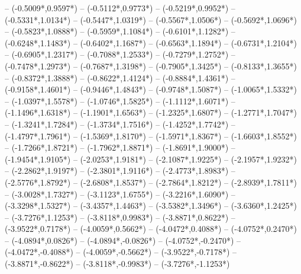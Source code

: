 {	-- ({-0.5009*\dx},{0.9597*\dy})
	-- ({-0.5112*\dx},{0.9773*\dy})
	-- ({-0.5219*\dx},{0.9952*\dy})
	-- ({-0.5331*\dx},{1.0134*\dy})
	-- ({-0.5447*\dx},{1.0319*\dy})
	-- ({-0.5567*\dx},{1.0506*\dy})
	-- ({-0.5692*\dx},{1.0696*\dy})
	-- ({-0.5823*\dx},{1.0888*\dy})
	-- ({-0.5959*\dx},{1.1084*\dy})
	-- ({-0.6101*\dx},{1.1282*\dy})
	-- ({-0.6248*\dx},{1.1483*\dy})
	-- ({-0.6402*\dx},{1.1687*\dy})
	-- ({-0.6563*\dx},{1.1894*\dy})
	-- ({-0.6731*\dx},{1.2104*\dy})
	-- ({-0.6905*\dx},{1.2317*\dy})
	-- ({-0.7088*\dx},{1.2533*\dy})
	-- ({-0.7279*\dx},{1.2752*\dy})
	-- ({-0.7478*\dx},{1.2973*\dy})
	-- ({-0.7687*\dx},{1.3198*\dy})
	-- ({-0.7905*\dx},{1.3425*\dy})
	-- ({-0.8133*\dx},{1.3655*\dy})
	-- ({-0.8372*\dx},{1.3888*\dy})
	-- ({-0.8622*\dx},{1.4124*\dy})
	-- ({-0.8884*\dx},{1.4361*\dy})
	-- ({-0.9158*\dx},{1.4601*\dy})
	-- ({-0.9446*\dx},{1.4843*\dy})
	-- ({-0.9748*\dx},{1.5087*\dy})
	-- ({-1.0065*\dx},{1.5332*\dy})
	-- ({-1.0397*\dx},{1.5578*\dy})
	-- ({-1.0746*\dx},{1.5825*\dy})
	-- ({-1.1112*\dx},{1.6071*\dy})
	-- ({-1.1496*\dx},{1.6318*\dy})
	-- ({-1.1901*\dx},{1.6563*\dy})
	-- ({-1.2325*\dx},{1.6807*\dy})
	-- ({-1.2771*\dx},{1.7047*\dy})
	-- ({-1.3241*\dx},{1.7284*\dy})
	-- ({-1.3734*\dx},{1.7516*\dy})
	-- ({-1.4252*\dx},{1.7742*\dy})
	-- ({-1.4797*\dx},{1.7961*\dy})
	-- ({-1.5369*\dx},{1.8170*\dy})
	-- ({-1.5971*\dx},{1.8367*\dy})
	-- ({-1.6603*\dx},{1.8552*\dy})
	-- ({-1.7266*\dx},{1.8721*\dy})
	-- ({-1.7962*\dx},{1.8871*\dy})
	-- ({-1.8691*\dx},{1.9000*\dy})
	-- ({-1.9454*\dx},{1.9105*\dy})
	-- ({-2.0253*\dx},{1.9181*\dy})
	-- ({-2.1087*\dx},{1.9225*\dy})
	-- ({-2.1957*\dx},{1.9232*\dy})
	-- ({-2.2862*\dx},{1.9197*\dy})
	-- ({-2.3801*\dx},{1.9116*\dy})
	-- ({-2.4773*\dx},{1.8983*\dy})
	-- ({-2.5776*\dx},{1.8792*\dy})
	-- ({-2.6808*\dx},{1.8537*\dy})
	-- ({-2.7864*\dx},{1.8212*\dy})
	-- ({-2.8939*\dx},{1.7811*\dy})
	-- ({-3.0028*\dx},{1.7327*\dy})
	-- ({-3.1123*\dx},{1.6755*\dy})
	-- ({-3.2216*\dx},{1.6090*\dy})
	-- ({-3.3298*\dx},{1.5327*\dy})
	-- ({-3.4357*\dx},{1.4463*\dy})
	-- ({-3.5382*\dx},{1.3496*\dy})
	-- ({-3.6360*\dx},{1.2425*\dy})
	-- ({-3.7276*\dx},{1.1253*\dy})
	-- ({-3.8118*\dx},{0.9983*\dy})
	-- ({-3.8871*\dx},{0.8622*\dy})
	-- ({-3.9522*\dx},{0.7178*\dy})
	-- ({-4.0059*\dx},{0.5662*\dy})
	-- ({-4.0472*\dx},{0.4088*\dy})
	-- ({-4.0752*\dx},{0.2470*\dy})
	-- ({-4.0894*\dx},{0.0826*\dy})
	-- ({-4.0894*\dx},{-0.0826*\dy})
	-- ({-4.0752*\dx},{-0.2470*\dy})
	-- ({-4.0472*\dx},{-0.4088*\dy})
	-- ({-4.0059*\dx},{-0.5662*\dy})
	-- ({-3.9522*\dx},{-0.7178*\dy})
	-- ({-3.8871*\dx},{-0.8622*\dy})
	-- ({-3.8118*\dx},{-0.9983*\dy})
	-- ({-3.7276*\dx},{-1.1253*\dy})
}
